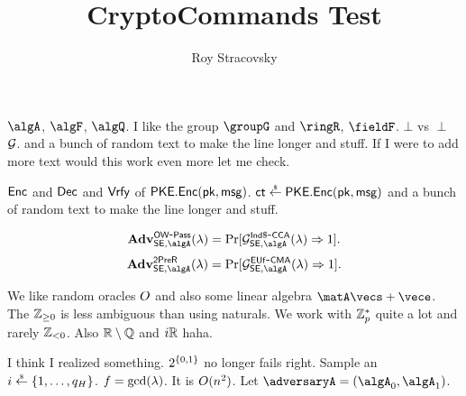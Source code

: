 \documentclass[11pt, oneside]{article}
\title{CryptoCommands Test}
\author{Roy Stracovsky}
\begin{document}
\maketitle

$\algA$, $\algF$, $\algQ$. I like the group $\groupG$ and $\ringR$, $\fieldF$. $\bot$ vs $\perp$
$\mathcal{G}$. and a bunch of random text to make the line longer and stuff. If I were to add more text would this work even more let me check.

$\mathsf{Enc}$ and $\mathsf{Dec}$ and $\mathsf{Vrfy}$ of $\mathsf{PKE}.\mathsf{Enc}(\mathsf{pk}, \mathsf{msg})$.
$\ct \sample \PKEncScheme.\PKEnc(\pk, \msg)$ and a bunch of random text to make the line longer and stuff.

$$ \Adv{\OWPass}{\SEncScheme, \algA}{\secpar} = \Pr[\game^\IndRCCA_{\SEncScheme, \algA}(\secpar) \outputs 1].$$
$$ \Adv{\SecPreimageRes}{\SEncScheme, \algA}{\secpar} = \Pr[\game^\EUfCMA_{\SEncScheme, \algA}(\secpar) \outputs 1].$$

We like random oracles $O$ and also some linear algebra $\matA\vecs + \vece$. The ${\mathbb{Z}_{\ge 0}}$ is less ambiguous than using naturals.
We work with ${\mathbb{Z}^\ast_{p}}$ quite a lot and rarely ${\mathbb{Z}_{< 0}}$. Also ${\mathbb{R} \setminus \mathbb{Q}}$ and ${i\mathbb{R}}$ haha.

I think I realized something. $2^{\{0, 1\}}$ no longer fails right.
Sample an $i \sample \Range{1}{q_H}$. $f = \gcd(\lambda)$. It is $O(n^2)$.
Let $\adversaryA = (\algA_0, \algA_1)$.  
\end{document}
